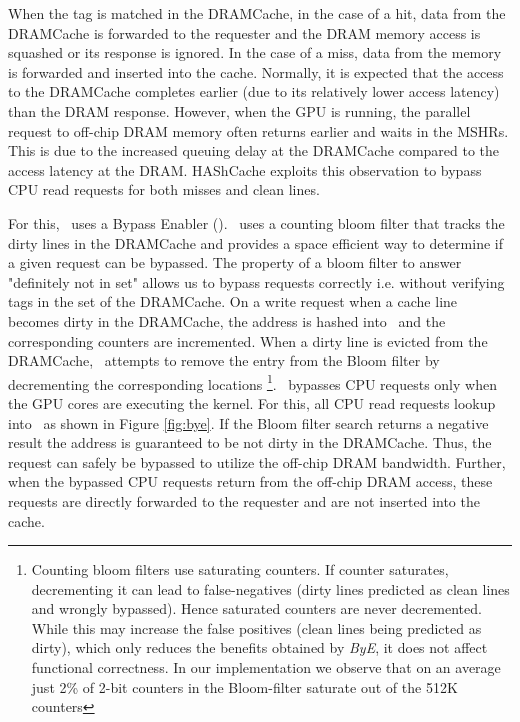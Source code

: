 When the tag is matched in the DRAMCache, in the case of a hit, data from the DRAMCache is forwarded to the requester and the DRAM memory access is squashed or its response is ignored. In the case of a miss, data from the memory is forwarded and inserted into the cache. Normally, it is expected that the access to the DRAMCache completes earlier (due to its relatively lower access latency) than the DRAM response. However, when the GPU is running, the parallel request to off-chip DRAM memory often returns earlier and waits in the MSHRs. This is due to the increased queuing delay at the DRAMCache compared to the access latency at the DRAM. HAShCache exploits this observation to bypass CPU read requests for both misses and clean lines.
\par For this, \cachename\ uses a Bypass Enabler (\bypassname). \bypassname\ uses a counting bloom filter \cite{bloom,counting-bloom} that tracks the dirty lines in the DRAMCache and provides a space efficient way to determine if a given request can be bypassed. The property of a bloom filter to answer "definitely not in set" allows us to bypass requests correctly i.e. without verifying tags in the set of the DRAMCache. 
On a write request when a cache line becomes dirty in the DRAMCache, the address is hashed into \bypassname\ and the corresponding counters are incremented. When a dirty line is evicted from the DRAMCache, \bypassname\ attempts to remove the entry from the Bloom filter by decrementing the corresponding locations \footnote{Counting bloom filters use saturating counters. If counter saturates, decrementing it can lead to false-negatives (dirty lines predicted as clean lines and wrongly bypassed). Hence saturated counters are never decremented.  While this may increase the false positives (clean lines being predicted as dirty), which only reduces the benefits obtained by \textit{ByE}, it does not affect functional correctness. In our implementation we observe that on an average just 2\% of 2-bit counters in the Bloom-filter saturate out of the 512K counters}.
\bypassname\ bypasses CPU requests only when the GPU cores are executing the kernel. For this, all CPU read requests lookup into \bypassname\ as shown in Figure \ref{fig:bye}. If the Bloom filter search returns a  negative result the address is guaranteed to be not dirty in the DRAMCache. Thus, the request can safely be bypassed to utilize the off-chip DRAM bandwidth. 
Further, when the bypassed CPU requests return from the off-chip DRAM access, these requests are directly forwarded to the requester and are not inserted into the cache. 
